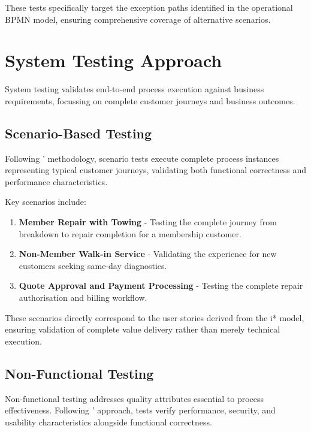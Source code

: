 \documentclass[14pt,a4paper]{article}
\begin{document}
These tests specifically target the exception paths identified in the operational BPMN model, ensuring comprehensive coverage of alternative scenarios.

\section{System Testing Approach}

System testing validates end-to-end process execution against business requirements, focussing on complete customer journeys and business outcomes.

\subsection{Scenario-Based Testing}

Following \textit{\parencite[p. 154]{Kunze2015}}' methodology, scenario tests execute complete process instances representing typical customer journeys, validating both functional correctness and performance characteristics.

Key scenarios include:

\begin{enumerate}
    \item \textbf{Member Repair with Towing} - Testing the complete journey from breakdown to repair completion for a membership customer.

    \item \textbf{Non-Member Walk-in Service} - Validating the experience for new customers seeking same-day diagnostics.

    \item \textbf{Quote Approval and Payment Processing} - Testing the complete repair authorisation and billing workflow.
\end{enumerate}

These scenarios directly correspond to the user stories derived from the i* model, ensuring validation of complete value delivery rather than merely technical execution.

\subsection{Non-Functional Testing}

Non-functional testing addresses quality attributes essential to process effectiveness. Following \textit{\parencite[p. 133]{Dustdar2016}}' approach, tests verify performance, security, and usability characteristics alongside functional correctness.
\end{document}
